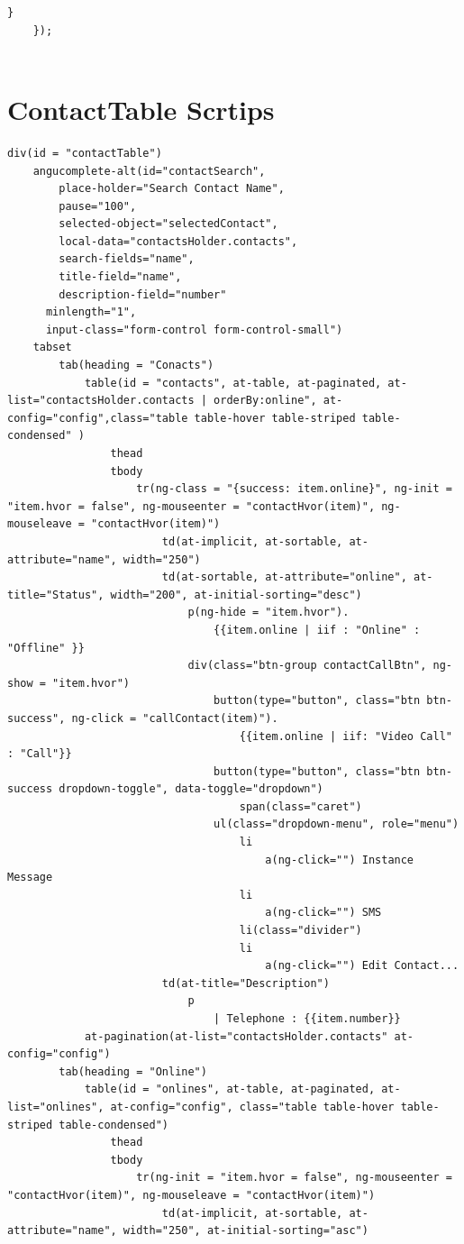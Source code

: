 \begin{appendices}
\begin{lstlisting}[caption={WebRTCService.js in application client},label={code:webrtc_service}]
		}
	});	
	
\end{lstlisting}

\section{ContactTable Scrtips} \label{app:contact_table}

\begin{lstlisting}[caption={contactTable.jade in application client},label={code:contact_table}]
div(id = "contactTable")
	angucomplete-alt(id="contactSearch",
		place-holder="Search Contact Name",
		pause="100",
		selected-object="selectedContact",
		local-data="contactsHolder.contacts",
		search-fields="name",
		title-field="name",
		description-field="number"
	  minlength="1",
	  input-class="form-control form-control-small")
	tabset
		tab(heading = "Conacts")
			table(id = "contacts", at-table, at-paginated, at-list="contactsHolder.contacts | orderBy:online", at-config="config",class="table table-hover table-striped table-condensed" )
				thead
				tbody
					tr(ng-class = "{success: item.online}", ng-init = "item.hvor = false", ng-mouseenter = "contactHvor(item)", ng-mouseleave = "contactHvor(item)")
						td(at-implicit, at-sortable, at-attribute="name", width="250")
						td(at-sortable, at-attribute="online", at-title="Status", width="200", at-initial-sorting="desc")
							p(ng-hide = "item.hvor").
								{{item.online | iif : "Online" : "Offline" }}
							div(class="btn-group contactCallBtn", ng-show = "item.hvor")
								button(type="button", class="btn btn-success", ng-click = "callContact(item)").
									{{item.online | iif: "Video Call" : "Call"}}
								button(type="button", class="btn btn-success dropdown-toggle", data-toggle="dropdown")
									span(class="caret")
								ul(class="dropdown-menu", role="menu")
									li
										a(ng-click="") Instance Message
									li
										a(ng-click="") SMS
									li(class="divider")
									li
										a(ng-click="") Edit Contact...
						td(at-title="Description")
							p
								| Telephone : {{item.number}}
			at-pagination(at-list="contactsHolder.contacts" at-config="config")
		tab(heading = "Online")
			table(id = "onlines", at-table, at-paginated, at-list="onlines", at-config="config", class="table table-hover table-striped table-condensed")
				thead
				tbody
					tr(ng-init = "item.hvor = false", ng-mouseenter = "contactHvor(item)", ng-mouseleave = "contactHvor(item)")
						td(at-implicit, at-sortable, at-attribute="name", width="250", at-initial-sorting="asc")

\end{lstlisting}
\end{appendices}
